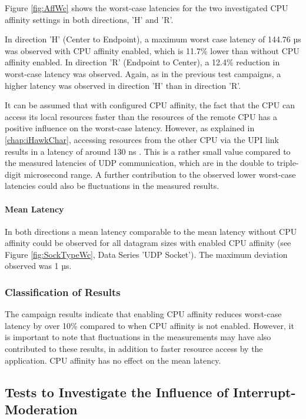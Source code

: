 Figure \ref{fig:AffWc} shows the worst-case latencies for the two investigated CPU affinity settings in both directions, 'H' and 'R'.

In direction 'H' (Center to Endpoint), a maximum worst case latency of 144.76 µs was observed with CPU affinity enabled, which is 11.7\% lower than without CPU affinity enabled. In direction 'R' (Endpoint to Center), a 12.4\% reduction in worst-case latency was observed. Again, as in the previous test campaigns, a higher latency was observed in direction 'H' than in direction 'R'.

It can be assumed that with configured CPU affinity, the fact that the CPU can access its local resources faster than the resources of the remote CPU has a positive influence on the worst-case latency. However, as explained in \ref{chap:iHawkChar}, accessing resources from the other CPU via the UPI link results in a latency of around 130 ns \cite{setup07}. This is a rather small value compared to the measured latencies of UDP communication, which are in the double to triple-digit microsecond range. A further contribution to the observed lower worst-case latencies could also be fluctuations in the measured results.

\paragraph{Mean Latency}

In both directions a mean latency comparable to the mean latency without CPU affinity could be observed for all datagram sizes with enabled CPU affinity (see Figure \ref{fig:SockTypeWc}, Data Series 'UDP Socket'). The maximum deviation observed was 1 µs.

\subsubsection{Classification of Results}
The campaign results indicate that enabling CPU affinity reduces worst-case latency by over 10\% compared to when CPU affinity is not enabled. However, it is important to note that fluctuations in the measurements may have also contributed to these results, in addition to faster resource access by the application. CPU affinity has no effect on the mean latency.

\subsection{Tests to Investigate the Influence of Interrupt-Moderation}
